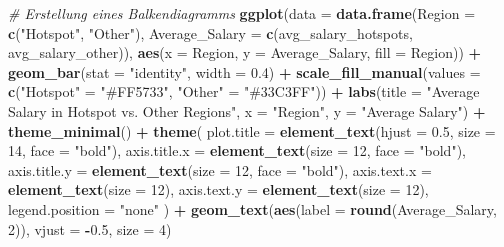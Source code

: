 \documentclass[
]{article}
\newenvironment{Shaded}{\begin{snugshade}}{\end{snugshade}}
\newcommand{\AttributeTok}[1]{\textcolor[rgb]{0.13,0.29,0.53}{#1}}
\newcommand{\CommentTok}[1]{\textcolor[rgb]{0.56,0.35,0.01}{\textit{#1}}}
\newcommand{\DecValTok}[1]{\textcolor[rgb]{0.00,0.00,0.81}{#1}}
\newcommand{\FloatTok}[1]{\textcolor[rgb]{0.00,0.00,0.81}{#1}}
\newcommand{\FunctionTok}[1]{\textcolor[rgb]{0.13,0.29,0.53}{\textbf{#1}}}
\newcommand{\NormalTok}[1]{#1}
\newcommand{\OtherTok}[1]{\textcolor[rgb]{0.56,0.35,0.01}{#1}}
\newcommand{\SpecialCharTok}[1]{\textcolor[rgb]{0.81,0.36,0.00}{\textbf{#1}}}
\newcommand{\StringTok}[1]{\textcolor[rgb]{0.31,0.60,0.02}{#1}}
\begin{document}
\begin{Shaded}
\begin{Highlighting}[]
\CommentTok{\# Erstellung eines Balkendiagramms}
\FunctionTok{ggplot}\NormalTok{(}\AttributeTok{data =} \FunctionTok{data.frame}\NormalTok{(}\AttributeTok{Region =} \FunctionTok{c}\NormalTok{(}\StringTok{"Hotspot"}\NormalTok{, }\StringTok{"Other"}\NormalTok{),}
                         \AttributeTok{Average\_Salary =} \FunctionTok{c}\NormalTok{(avg\_salary\_hotspots,}
\NormalTok{                                            avg\_salary\_other)),}
       \FunctionTok{aes}\NormalTok{(}\AttributeTok{x =}\NormalTok{ Region, }\AttributeTok{y =}\NormalTok{ Average\_Salary, }\AttributeTok{fill =}\NormalTok{ Region)) }\SpecialCharTok{+}
  \FunctionTok{geom\_bar}\NormalTok{(}\AttributeTok{stat =} \StringTok{"identity"}\NormalTok{, }\AttributeTok{width =} \FloatTok{0.4}\NormalTok{) }\SpecialCharTok{+}
  \FunctionTok{scale\_fill\_manual}\NormalTok{(}\AttributeTok{values =} \FunctionTok{c}\NormalTok{(}\StringTok{"Hotspot"} \OtherTok{=} \StringTok{"\#FF5733"}\NormalTok{, }\StringTok{"Other"} \OtherTok{=} \StringTok{"\#33C3FF"}\NormalTok{)) }\SpecialCharTok{+}
  \FunctionTok{labs}\NormalTok{(}\AttributeTok{title =} \StringTok{"Average Salary in Hotspot vs. Other Regions"}\NormalTok{,}
       \AttributeTok{x =} \StringTok{"Region"}\NormalTok{,}
       \AttributeTok{y =} \StringTok{"Average Salary"}\NormalTok{) }\SpecialCharTok{+}
  \FunctionTok{theme\_minimal}\NormalTok{() }\SpecialCharTok{+}
  \FunctionTok{theme}\NormalTok{(}
    \AttributeTok{plot.title =} \FunctionTok{element\_text}\NormalTok{(}\AttributeTok{hjust =} \FloatTok{0.5}\NormalTok{, }\AttributeTok{size =} \DecValTok{14}\NormalTok{, }\AttributeTok{face =} \StringTok{"bold"}\NormalTok{),}
    \AttributeTok{axis.title.x =} \FunctionTok{element\_text}\NormalTok{(}\AttributeTok{size =} \DecValTok{12}\NormalTok{, }\AttributeTok{face =} \StringTok{"bold"}\NormalTok{),}
    \AttributeTok{axis.title.y =} \FunctionTok{element\_text}\NormalTok{(}\AttributeTok{size =} \DecValTok{12}\NormalTok{, }\AttributeTok{face =} \StringTok{"bold"}\NormalTok{),}
    \AttributeTok{axis.text.x =} \FunctionTok{element\_text}\NormalTok{(}\AttributeTok{size =} \DecValTok{12}\NormalTok{),}
    \AttributeTok{axis.text.y =} \FunctionTok{element\_text}\NormalTok{(}\AttributeTok{size =} \DecValTok{12}\NormalTok{),}
    \AttributeTok{legend.position =} \StringTok{"none"}
\NormalTok{  ) }\SpecialCharTok{+}
  \FunctionTok{geom\_text}\NormalTok{(}\FunctionTok{aes}\NormalTok{(}\AttributeTok{label =} \FunctionTok{round}\NormalTok{(Average\_Salary, }\DecValTok{2}\NormalTok{)), }\AttributeTok{vjust =} \SpecialCharTok{{-}}\FloatTok{0.5}\NormalTok{, }\AttributeTok{size =} \DecValTok{4}\NormalTok{)}
\end{Highlighting}
\end{Shaded}
\end{document}
